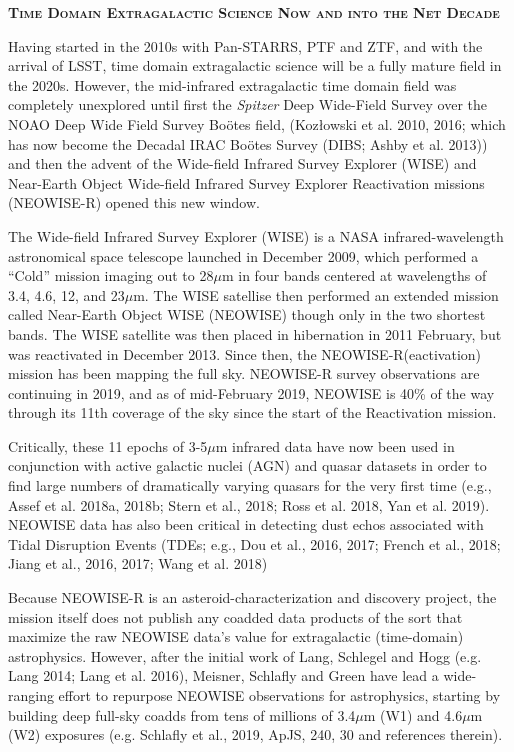 \documentclass[12pt]{article}
\begin{document}
\pagebreak
\smallskip
\smallskip
\noindent
{\bfseries \textsc{\textcolor{Cerulean}{Time Domain Extragalactic Science Now and into the Net Decade}}}

\smallskip
\smallskip 
\noindent
Having started in the 2010s with Pan-STARRS, PTF and ZTF, and with the
arrival of LSST, time domain extragalactic science will be a fully
mature field in the 2020s. However, the mid-infrared extragalactic
time domain field was completely unexplored until first the {\it
Spitzer} Deep Wide-Field Survey over the NOAO Deep Wide Field Survey
Bo\"{o}tes field, (Koz{\l}owski et al. 2010, 2016; which has now
become the Decadal IRAC Bo\"{o}tes Survey (DIBS; Ashby et al. 2013))
and then the advent of the Wide-field Infrared Survey Explorer (WISE)
and Near-Earth Object Wide-field Infrared Survey Explorer Reactivation
missions (NEOWISE-R) opened this new window.

\smallskip 
\smallskip 
\noindent
The Wide-field Infrared Survey Explorer (WISE) is a NASA
infrared-wavelength astronomical space telescope launched in December
2009, which performed a ``Cold'' mission imaging out to 28$\mu$m in
four bands centered at wavelengths of 3.4, 4.6, 12, and 23$\mu$m. The
WISE satellise then performed an extended mission called Near-Earth
Object WISE (NEOWISE) though only in the two shortest bands. The WISE
satellite was then placed in hibernation in 2011 February, but was
reactivated in December 2013.  Since then, the NEOWISE-R(eactivation)
mission has been mapping the full sky. NEOWISE-R survey observations
are continuing in 2019, and as of mid-February 2019, NEOWISE is 40\%
of the way through its 11th coverage of the sky since the start of the
Reactivation mission.

\smallskip
\smallskip 
\noindent
Critically, these 11 epochs of 3-5$\mu$m infrared data have now been
used in conjunction with active galactic nuclei (AGN) and quasar
datasets in order to find large numbers of dramatically varying
quasars for the very first time (e.g., Assef et al. 2018a, 2018b; Stern
et al., 2018; Ross et al. 2018, Yan et al. 2019). NEOWISE data has
also been critical in detecting dust echos associated with Tidal
Disruption Events (TDEs; e.g., Dou et al., 2016, 2017; French et al., 2018;
Jiang et al., 2016, 2017; Wang et al. 2018)

\smallskip
\smallskip
\noindent
Because NEOWISE-R is an asteroid-characterization and discovery
project, the mission itself does not publish any coadded data products
of the sort that maximize the raw NEOWISE data’s value for
extragalactic (time-domain) astrophysics. However, after the initial
work of Lang, Schlegel and Hogg (e.g. Lang 2014; Lang et al. 2016),
Meisner, Schlafly and Green have lead a wide-ranging effort to
repurpose NEOWISE observations for astrophysics, starting by building
deep full-sky coadds from tens of millions of 3.4$\mu$m (W1) and
4.6$\mu$m (W2) exposures (e.g. Schlafly  et al., 2019, ApJS, 240, 30 and references
therein).
\end{document}

